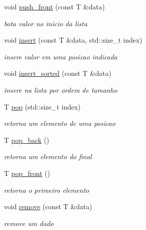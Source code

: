 \begin{DoxyCompactItemize}
void \mbox{\hyperlink{classstructures_1_1ArrayList_a3920da2ade2ac6d1045f464d71a4f745}{push\+\_\+front}} (const T \&data)
\begin{DoxyCompactList}\small\item\em bota valor no inicio da lista \end{DoxyCompactList}\item 
void \mbox{\hyperlink{classstructures_1_1ArrayList_a06a3db6492b5611c7e9784f022aa0493}{insert}} (const T \&data, std\+::size\+\_\+t index)
\begin{DoxyCompactList}\small\item\em insere valor em uma posicao indicada \end{DoxyCompactList}\item 
void \mbox{\hyperlink{classstructures_1_1ArrayList_a7e8c6476fac5af0c3d462c5546e5f8fe}{insert\+\_\+sorted}} (const T \&data)
\begin{DoxyCompactList}\small\item\em insere na lista por ordem de tamanho \end{DoxyCompactList}\item 
T \mbox{\hyperlink{classstructures_1_1ArrayList_ab168d19e50911171715ed5ceccde79b1}{pop}} (std\+::size\+\_\+t index)
\begin{DoxyCompactList}\small\item\em retorna um elemento de uma posicao \end{DoxyCompactList}\item 
T \mbox{\hyperlink{classstructures_1_1ArrayList_ae9049f86f313cb35075218640e858f6d}{pop\+\_\+back}} ()
\begin{DoxyCompactList}\small\item\em retorna um elemento do final \end{DoxyCompactList}\item 
T \mbox{\hyperlink{classstructures_1_1ArrayList_a8f8540ed89c0482099bf7768a668d4e5}{pop\+\_\+front}} ()
\begin{DoxyCompactList}\small\item\em retorna o primeiro elemento \end{DoxyCompactList}\item 
void \mbox{\hyperlink{classstructures_1_1ArrayList_a50206e6cd81935fc838f6fb45cfd9a7d}{remove}} (const T \&data)
\begin{DoxyCompactList}\small\item\em remove um dado \end{DoxyCompactList}\item 

\end{DoxyCompactItemize}
